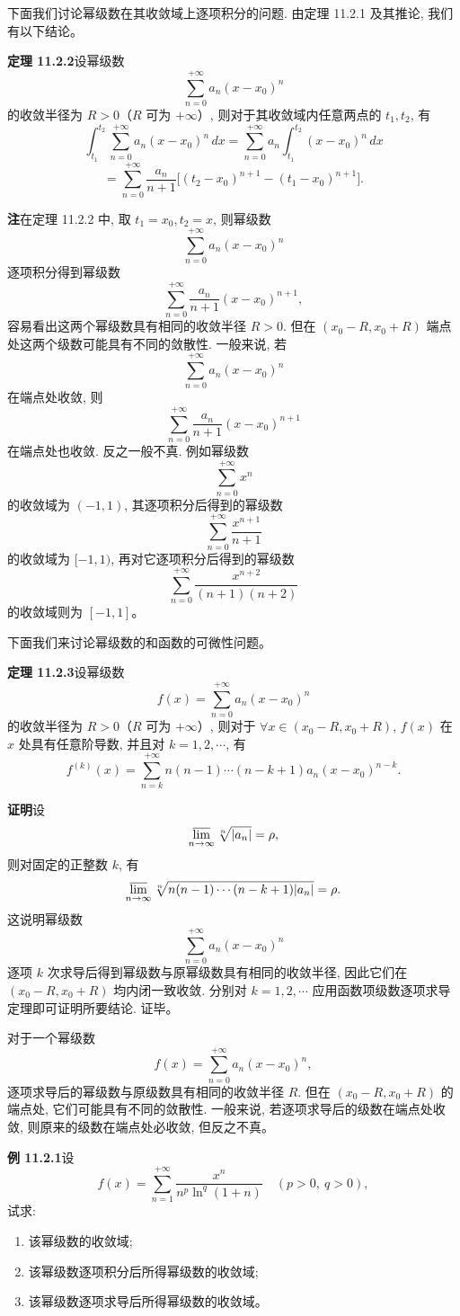 \documentclass[UTF8,12pt,a4paper,fontset=fandol]{ctexart}
\begin{document}
下面我们讨论幂级数在其收敛域上逐项积分的问题. 由定理 11.2.1 及其推论, 我们有以下结论。

\noindent\textbf{定理 11.2.2}\quad 设幂级数
\[
  \sum_{n=0}^{+\infty}a_n(x-x_0)^n
\]
的收敛半径为 $R>0$（$R$ 可为 $+\infty$）, 则对于其收敛域内任意两点的 $t_1,t_2$, 有
\[
  \int_{t_1}^{t_2}\sum_{n=0}^{+\infty}a_n(x-x_0)^n\,dx
  =
  \sum_{n=0}^{+\infty}a_n\int_{t_1}^{t_2}(x-x_0)^n\,dx
\]
\[
  =
  \sum_{n=0}^{+\infty}\frac{a_n}{n+1}
  \bigl[(t_2-x_0)^{n+1}-(t_1-x_0)^{n+1}\bigr].
\]

\noindent\textbf{注}\quad 在定理 11.2.2 中, 取 $t_1=x_0,t_2=x$, 则幂级数
\[
  \sum_{n=0}^{+\infty}a_n(x-x_0)^n
\]
逐项积分得到幂级数
\[
  \sum_{n=0}^{+\infty}\frac{a_n}{n+1}(x-x_0)^{n+1},
\]
容易看出这两个幂级数具有相同的收敛半径 $R>0$. 但在 $(x_0-R,x_0+R)$ 端点处这两个级数可能具有不同的敛散性. 一般来说, 若
\[
  \sum_{n=0}^{+\infty}a_n(x-x_0)^n
\]
在端点处收敛, 则
\[
  \sum_{n=0}^{+\infty}\frac{a_n}{n+1}(x-x_0)^{n+1}
\]
在端点处也收敛. 反之一般不真. 例如幂级数
\[
  \sum_{n=0}^{+\infty}x^n
\]
的收敛域为 $(-1,1)$, 其逐项积分后得到的幂级数
\[
  \sum_{n=0}^{+\infty}\frac{x^{n+1}}{n+1}
\]
的收敛域为 $[-1,1)$, 再对它逐项积分后得到的幂级数
\[
  \sum_{n=0}^{+\infty}\frac{x^{n+2}}{(n+1)(n+2)}
\]
的收敛域则为 $[-1,1]$。

下面我们来讨论幂级数的和函数的可微性问题。

\noindent\textbf{定理 11.2.3}\quad 设幂级数
\[
  f(x)=\sum_{n=0}^{+\infty}a_n(x-x_0)^n
\]
的收敛半径为 $R>0$（$R$ 可为 $+\infty$）, 则对于 $\forall x\in(x_0-R,x_0+R)$, $f(x)$ 在 $x$ 处具有任意阶导数, 并且对 $k=1,2,\cdots$, 有
\[
  f^{(k)}(x)
  =
  \sum_{n=k}^{+\infty}n(n-1)\cdots(n-k+1)a_n(x-x_0)^{n-k}.
\]

\noindent\textbf{证明}\quad 设
\[
  \varlimsup_{n\to\infty}\sqrt[n]{|a_n|}=\rho,
\]
则对固定的正整数 $k$, 有
\[
  \varlimsup_{n\to\infty}
  \sqrt[n]{n(n-1)\cdots(n-k+1)|a_n|}
  =\rho.
\]
这说明幂级数
\[
  \sum_{n=0}^{+\infty}a_n(x-x_0)^n
\]
逐项 $k$ 次求导后得到幂级数与原幂级数具有相同的收敛半径, 因此它们在 $(x_0-R,x_0+R)$ 均内闭一致收敛. 分别对 $k=1,2,\cdots$ 应用函数项级数逐项求导定理即可证明所要结论. 证毕。

对于一个幂级数
\[
  f(x)=\sum_{n=0}^{+\infty}a_n(x-x_0)^n,
\]
逐项求导后的幂级数与原级数具有相同的收敛半径 $R$. 但在 $(x_0-R,x_0+R)$ 的端点处, 它们可能具有不同的敛散性. 一般来说, 若逐项求导后的级数在端点处收敛, 则原来的级数在端点处必收敛, 但反之不真。

\noindent\textbf{例 11.2.1}\quad 设
\[
  f(x)=\sum_{n=1}^{+\infty}\frac{x^n}{n^p\ln^q(1+n)}
  \quad(p>0,\ q>0),
\]
试求:
\begin{enumerate}
  \item 该幂级数的收敛域;
  \item 该幂级数逐项积分后所得幂级数的收敛域;
  \item 该幂级数逐项求导后所得幂级数的收敛域。
\end{enumerate}
\end{document}

